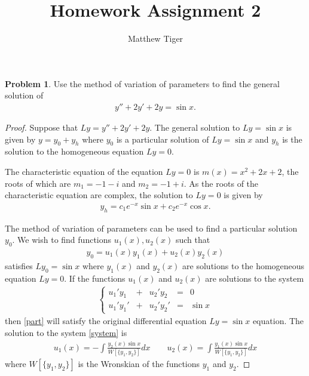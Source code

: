 \documentclass[12pt]{article}
\title{Homework Assignment 2}
\author{Matthew Tiger}
\theoremstyle{definition}
\newtheorem{problem}{Problem}
\begin{document}
\maketitle


\begin{problem}
  Use the method of variation of parameters to find the general solution of
  \begin{align*}
    y'' + 2y' + 2y = \sin x.
  \end{align*}
\end{problem}

\begin{proof}
  Suppose that $Ly = y'' + 2y' + 2y$. The general solution to $Ly = \sin x$ is
  given by $y = y_0 + y_h$ where $y_0$ is a particular solution of $Ly = \sin x$
  and $y_h$ is the solution to the homogeneous equation $Ly = 0$.

  The characteristic equation of the equation $Ly = 0$ is $m(x) = x^2 + 2x + 2$,
  the roots of which are $m_1 = -1 - i$ and $m_2 = -1 + i$. As the roots of the characteristic equation are complex,
  the solution to $Ly = 0$ is given by
  \begin{align}\label{hom}
    y_h =  c_1e^{-x}\sin x + c_2 e^{-x}\cos x.
  \end{align}

  The method of variation of parameters can be used to find a particular
  solution $y_0$. We wish to find functions $u_1(x), u_2(x)$
  such that
  \begin{align}\label{part}
    y_0 = u_1(x) y_1(x) + u_2(x) y_2(x)
  \end{align}
  satisfies $Ly_0 = \sin x$ where $y_1(x)$ and $y_2(x)$ are solutions to the
  homogeneous equation $Ly = 0$. If the functions
  $u_1(x)$ and $u_2(x)$ are solutions to the system
  \begin{align}\label{system}
    \left\{
      \begin{array}{lllll}
        u_1'y_1 &+& u_2'y_2 &=& 0 \\
        u_1' y_1' &+& u_2' y_2' &=& \sin x
      \end{array}
    \right.
  \end{align}
  then \eqref{part} will satisfy the original differential equation $Ly = \sin x$
  equation. The solution to the system \eqref{system} is
  \begin{align}\label{solution}
    u_1(x) = -\int \frac{y_2(x)\sin x }{W[\{y_1, y_2\}]} dx \qquad u_2(x) = \int \frac{y_1(x)\sin x}{W[\{y_1, y_2\}]} dx
  \end{align}
  where $W[\{y_1, y_2\}]$ is the Wronskian of the functions $y_1$ and $y_2$.


\end{proof}
\end{document}
